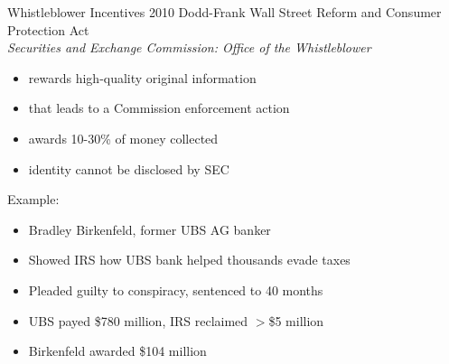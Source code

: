 \documentclass{beamer}
\begin{document}
\begin{frame}{Whistleblower Incentives}
2010 Dodd-Frank Wall Street Reform and Consumer Protection Act\\
\emph{Securities and Exchange Commission: Office of the Whistleblower}
\begin{itemize}
\item rewards high-quality original information
\item that leads to a Commission enforcement action
\item awards 10-30\% of money collected
\item identity cannot be disclosed by SEC
\end{itemize}
\bigskip
Example:
\begin{itemize}
\item Bradley Birkenfeld, former UBS AG banker
\item Showed IRS how UBS bank helped thousands evade taxes
\item Pleaded guilty to conspiracy, sentenced to 40 months
\item UBS payed \$780 million, IRS reclaimed $>$\$5 million
\item Birkenfeld awarded \$104 million
\end{itemize}
\end{frame}
\end{document}

